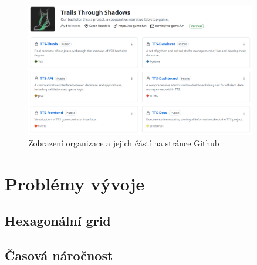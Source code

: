 \begin{figure}[h]
    \centering
    \includegraphics[width=0.9\textwidth]{../../shared/figures/gitOrg}
    \caption{Zobrazení organizace a jejich částí na stránce Github}
    \label{fig:git_organization}
\end{figure}

\section{Problémy vývoje}
\label{sec:implementation-problems}

\subsection*{Hexagonální grid}
\label{subsec:implementation-problems-hexagon}

\subsection*{Časová náročnost}
\label{subsec:implementation-problems-time}

%

\endinput